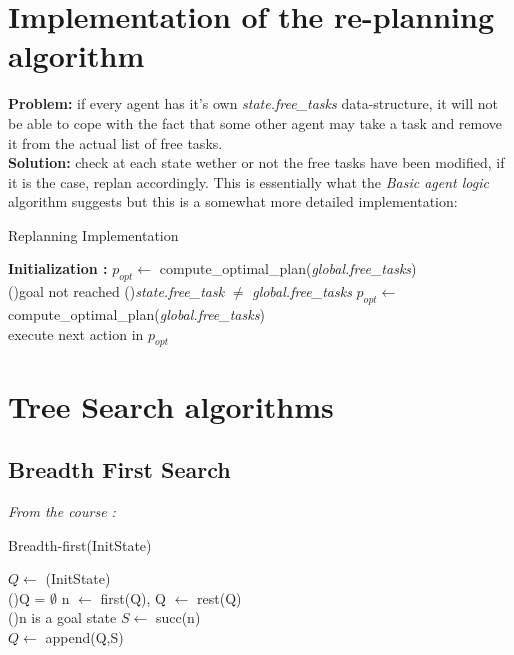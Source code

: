 \documentclass[11pt]{article}
\begin{document}
\section{Implementation of the re-planning algorithm}

\textbf{Problem: }if every agent has it's own \emph{state.free\_tasks} data-structure, it will not be able to cope with the fact that some other agent may take a task and remove it from the actual list of free tasks.\\
\textbf{Solution: }check at each state wether or not the free tasks have been modified, if it is the case, replan accordingly. This is essentially what the \emph{Basic agent logic} algorithm suggests but this is a somewhat more detailed implementation:

\begin{algorithm}
    \SetAlgoLined
    \caption{Replanning Implementation}
    \textbf{Initialization :} $p_{opt}\leftarrow $ compute\_optimal\_plan(\emph{global.free\_tasks})  \\
    \While(){goal not reached}{
        \If(){\emph{state.free\_task} $\neq$ \emph{global.free\_tasks}}{
            $p_{opt} \leftarrow$ compute\_optimal\_plan(\emph{global.free\_tasks}) \\
        }
        execute next action in $p_{opt}$
    }
\end{algorithm}

\newpage
\section{Tree Search algorithms}

\subsection{Breadth First Search}

\emph{From the course : }

\begin{algorithm}[H]
    \caption{Breadth-first(InitState)}
    \SetAlgoLined
    $Q \leftarrow$ (InitState) \\
    \Repeat(){Q = $\emptyset$}{
        n $\leftarrow$ first(Q), Q $\leftarrow$ rest(Q) \\
        \If(){n is a goal state}{
        }
        $S \leftarrow$ succ(n) \\
        $Q \leftarrow$ append(Q,S)
    }
\end{algorithm}
\end{document}

